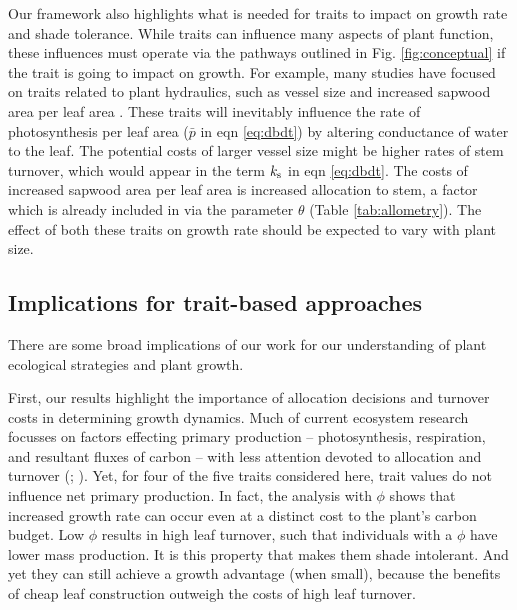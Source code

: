 \documentclass[9pt,twocolumn,twoside]{pnas-new}
\begin{document}
Our framework also highlights what is needed for traits to impact on growth rate and shade tolerance. While traits can influence many aspects of plant function, these influences must operate via the pathways outlined in Fig. \ref{fig:conceptual} if the trait is going to impact on growth. For example, many studies have focused on traits related to plant hydraulics, such as vessel size and increased sapwood area per leaf area \citep{Zanne-2010}. These traits will inevitably influence the rate of photosynthesis per leaf area ($\bar{p}$ in eqn \ref{eq:dbdt}) by altering conductance of water to the leaf. The potential costs of larger vessel size might be higher rates of stem turnover, which would appear in the term $k_{\rm s}$ in eqn \ref{eq:dbdt}. The costs of increased sapwood area per leaf area is increased allocation to stem, a factor which is already included in via the parameter $\theta$ (Table \ref{tab:allometry}). The effect of both these traits on growth rate should be expected to vary with plant size.

\subsection{Implications for trait-based approaches}

There are some broad implications of our work for our understanding of plant ecological strategies and plant growth.

First, our results highlight the importance of allocation decisions and turnover costs in determining growth dynamics.
Much of current ecosystem research focusses on factors effecting primary production -- photosynthesis, respiration, and resultant fluxes of carbon -- with less attention devoted to allocation and turnover (\citealp{Friend-2014}; \citealp[for comparisons of models see][]{Sitch-2008, DeKauwe-2014}). Yet, for four of the five traits considered here, trait values do not influence net primary production. In fact, the analysis with $\phi$ shows that increased growth rate can occur even at a distinct cost to the plant's carbon budget. Low $\phi$ results in high leaf turnover, such that individuals with a $\phi$ have lower mass production. It is this property that makes them shade intolerant. And yet they can still achieve a growth advantage (when small), because the benefits of cheap leaf construction outweigh the costs of high leaf turnover.

\end{document}
